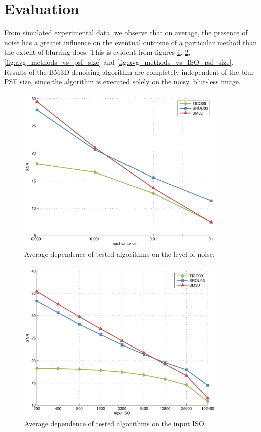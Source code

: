 \documentclass[12pt,notitlepage]{report}
\begin{document}
\clearpage


\section{Evaluation}
\label{sec:evaluation}

From simulated experimental data, we observe that on average, the presence of noise has a greater influence on the eventual outcome of a particular method than the extent of blurring does. This is evident from figures \ref{fig:avg_methods_vs_var}, \ref{fig:avg_methods_vs_ISO}, \ref{fig:avg_methods_vs_psf_size} and \ref{fig:avg_methods_vs_ISO_psf_size}. Results of the BM3D denoising algorithm are completely independent of the blur PSF size, since the algorithm is executed solely on the noisy, blur-less image.

\begin{figure}[htb]
 \centering
  \includegraphics[width=0.9\textwidth]{avg_methods_vs_var.pdf}
 \caption{Average dependence of tested algorithms on the level of noise.}
 \label{fig:avg_methods_vs_var}
\end{figure}

\begin{figure}[htb]
 \centering
  \includegraphics[width=0.9\textwidth]{avg_methods_vs_ISO.pdf}
 \caption{Average dependence of tested algorithms on the input ISO.}
 \label{fig:avg_methods_vs_ISO}
\end{figure}
\end{document}
